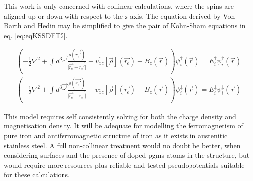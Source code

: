 This work is only concerned with collinear calculations, where the spins are aligned up or down with respect to the z-axis.  The equation derived by Von Barth and Hedin may be simplified to give the pair of Kohn-Sham equations in eq. \ref{eq:eqKSSDFT2}.

\begin{equation}
\begin{split}
\left(-\frac{1}{2} \nabla^2  + \int d^3\vec{r'} \frac{\rho(\vec{r_{e}'})}{\lvert \vec{r_{e}} - \vec{r_{e}'} \rvert} + v^{\uparrow}_{xc}[\vec{\rho}](\vec{r_{e}}) + B_{z}(\vec{r}) \right)\psi^{\uparrow}_{i}(\vec{r}) = E^{\uparrow}_i \psi^{\uparrow}_{i}(\vec{r})  \\
\left(-\frac{1}{2} \nabla^2  + \int d^3\vec{r'} \frac{\rho(\vec{r_{e}'})}{\lvert \vec{r_{e}} - \vec{r_{e}'} \rvert} + v^{\downarrow}_{xc}[\vec{\rho}](\vec{r_{e}}) - B_{z}(\vec{r}) \right)\psi^{\downarrow}_{i}(\vec{r}) = E^{\downarrow}_i \psi^{\downarrow}_{i}(\vec{r})
\label{eq:eqKSSDFT2}
\end{split}
\end{equation}

This model requires self consistently solving for both the charge density and magnetisation density.  It will be adequate for modelling the ferromagnetism of pure iron and antiferromagnetic structure of iron as it exists in austenitic stainless steel.  A full non-collinear treatment would no doubt be better, when considering surfaces and the presence of doped \acrshort{pgm}s atoms in the structure, but would require more resources plus reliable and tested pseudopotentials suitable for these calculations.




